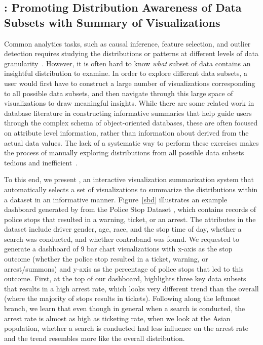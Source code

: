 \subsection{\sbd: Promoting Distribution Awareness of Data Subsets with Summary of Visualizations}
\par Common analytics tasks, such as causal inference, feature selection, and outlier detection requires studying the distributions or patterns at different levels of data granularity~\cite{Anand2015,Wu2013,Heer2012}. However, it is often hard to know \textit{what} subset of data contains an insightful distribution to examine. In order to explore different data subsets, a user would first have to construct a large number of visualizations corresponding to all possible data subsets, and then navigate through this large space of visualizations to draw meaningful insights. While there are some related work in database literature in constructing informative summaries that help guide users through the complex schema of object-oriented databases\cite{Yu2006,McHugh1997}, these are often focused on attribute level information, rather than information about derived from the actual data values. The lack of a systematic way to perform these exercises makes the process of manually exploring distributions from all possible data subsets tedious and inefficient~\cite{Sarawagi1998,Sarawagi2000}.
\par To this end, we present \sbd, an interactive visualization summarization system that automatically selects a set of visualizations to summarize the distributions within a dataset in an informative manner. Figure~\ref{sbd} illustrates an example dashboard generated by \sbd from the Police Stop Dataset \cite{police}, which contains records of police stops that resulted in a warning, ticket, or an arrest. The attributes in the dataset include driver gender, age, race, and the stop time of day, whether a search was conducted, and whether contraband was found. We requested \sbd to generate a dashboard of 9 bar chart visualizations with x-axis as the stop outcome (whether the police stop resulted in a ticket, warning, or arrest/summons) and y-axis as the percentage of police stops that led to this outcome. First, at the top of our dashboard, \sbd highlights three key data subsets that results in a high arrest rate, which looks very different trend than the overall (where the majority of stops results in tickets). Following along the leftmost branch, we learn that even though in general when a search is conducted, the arrest rate is almost as high as ticketing rate, when we look at the Asian population, whether a search is conducted had less influence on the arrest rate and the trend resembles more like the overall distribution.
